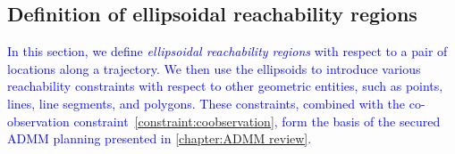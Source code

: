 \documentclass[10pt,twocolumn,twoside]{IEEEtran}
\newcommand{\new}[1]{\textcolor{blue}{#1}}
\begin{document}
\subsection{Definition of ellipsoidal reachability regions}\label{sec:reachability}

\new{In this section, we define \emph{ellipsoidal reachability regions} with respect to a pair of locations along a trajectory. We then use the ellipsoids to introduce various reachability constraints with respect to other geometric entities, such as points, lines, line segments, and polygons. These constraints, combined with the co-observation constraint~\ref{constraint:coobservation}, form the basis of the secured ADMM planning presented in \cref{chapter:ADMM review}.
}
\end{document}
